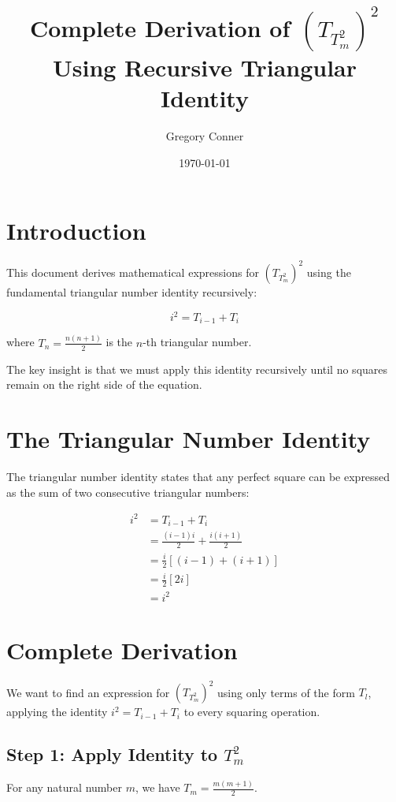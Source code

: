 \documentclass{article}
\title{Complete Derivation of $(T_{T_m^2})^2$ Using Recursive Triangular Identity}
\author{Gregory Conner}
\date{\today}
\begin{document}
\maketitle

\section{Introduction}

This document derives mathematical expressions for $(T_{T_m^2})^2$ using the fundamental triangular number identity recursively:

\begin{equation}
i^2 = T_{i-1} + T_i
\end{equation}

where $T_n = \frac{n(n+1)}{2}$ is the $n$-th triangular number.

The key insight is that we must apply this identity recursively until no squares remain on the right side of the equation.

\section{The Triangular Number Identity}

The triangular number identity states that any perfect square can be expressed as the sum of two consecutive triangular numbers:

\begin{align}
i^2 &= T_{i-1} + T_i \\
&= \frac{(i-1)i}{2} + \frac{i(i+1)}{2} \\
&= \frac{i}{2}[(i-1) + (i+1)] \\
&= \frac{i}{2}[2i] \\
&= i^2
\end{align}

\section{Complete Derivation}

We want to find an expression for $(T_{T_m^2})^2$ using only terms of the form $T_l$, applying the identity $i^2 = T_{i-1} + T_i$ to every squaring operation.

\subsection{Step 1: Apply Identity to $T_m^2$}

For any natural number $m$, we have $T_m = \frac{m(m+1)}{2}$.
\end{document}

